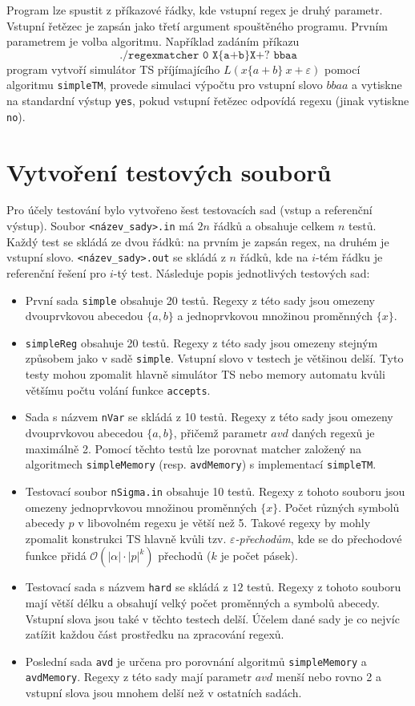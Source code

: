 \documentclass[thesis=B,czech]{FITthesis}[2019/12/23]
\theoremstyle{definition}
\begin{document}
Program lze spustit z příkazové řádky, kde vstupní regex je druhý parametr. Vstupní řetězec je zapsán jako třetí argument spouštěného programu. Prvním parametrem je volba algoritmu. Například zadáním příkazu $$\texttt{./regexmatcher 0 X\{a+b\}X+? bbaa}$$ program vytvoří simulátor TS příjímajícího ${L(x\{a+b\}\ x+\varepsilon)}$ pomocí algoritmu \texttt{simpleTM}, provede simulaci výpočtu pro vstupní slovo $bbaa$ a vytiskne na standardní výstup \texttt{yes}, pokud vstupní řetězec odpovídá regexu (jinak vytiskne \texttt{no}).

\section{Vytvoření testových souborů}
Pro účely testování bylo vytvořeno šest testovacích sad (vstup a referenční výstup). Soubor \texttt{<název\_sady>.in} má $2n$ řádků a obsahuje celkem $n$ testů. Každý test se skládá ze dvou řádků: na prvním je zapsán regex, na druhém je vstupní slovo. \texttt{<název\_sady>.out} se skládá z $n$ řádků, kde na $i$-tém řádku je referenční řešení pro $i$-tý test. Následuje popis jednotlivých testových sad:
\begin{itemize}
	\item{První sada \texttt{simple} obsahuje 20 testů. Regexy z této sady jsou omezeny dvouprvkovou abecedou $\{a, b\}$ a jednoprvkovou množinou proměnných $\{x\}$.}
	\item{\texttt{simpleReg} obsahuje 20 testů. Regexy z této sady jsou omezeny stejným způsobem jako v sadě \texttt{simple}. Vstupní slovo v testech je většinou delší. Tyto testy mohou zpomalit hlavně simulátor TS nebo memory automatu kvůli většímu počtu volání funkce \texttt{accepts}. }
	\item{Sada s názvem \texttt{nVar} se skládá z 10 testů. Regexy z této sady jsou omezeny dvouprvkovou abecedou $\{a, b\}$, přičemž parametr $avd$ daných regexů je maximálně 2. Pomocí těchto testů lze porovnat matcher založený na algoritmech \texttt{simpleMemory} (resp. \texttt{avdMemory}) s implementací \texttt{simpleTM}.}
	\item{Testovací soubor \texttt{nSigma.in} obsahuje 10 testů. Regexy z tohoto souboru jsou omezeny jednoprvkovou množinou proměnných $\{x\}$. Počet různých symbolů abecedy $p$ v libovolném regexu je větší než 5. Takové regexy by mohly zpomalit konstrukci TS hlavně kvůli tzv. \emph{$\varepsilon$-přechodům}, kde se do přechodové funkce přidá $\mathcal{O}(|\alpha|\cdot|p|^{k})$ přechodů ($k$ je počet pásek). }
	\item{Testovací sada s názvem \texttt{hard} se skládá z $12$ testů. Regexy z tohoto souboru mají větší délku a obsahují velký počet proměnných a symbolů abecedy. Vstupní slova jsou také v těchto testech delší. Účelem dané sady je co nejvíc zatížit každou část prostředku na zpracování regexů.}
	\item{Poslední sada \texttt{avd} je určena pro porovnání algoritmů \texttt{simpleMemory} a \texttt{avdMemory}. Regexy z této sady mají parametr $avd$ menší nebo rovno 2 a vstupní slova jsou mnohem delší než v ostatních sadách.}
\end{itemize}
\end{document}
